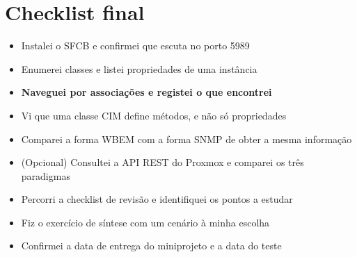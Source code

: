 \documentclass[11pt,a4paper]{article}
\begin{document}
\section{Checklist final}

\begin{itemize}
  \item[$\square$] Instalei o SFCB e confirmei que escuta no porto 5989
  \item[$\square$] Enumerei classes e listei propriedades de uma instância
  \item[$\square$] \textbf{Naveguei por associações e registei o que encontrei}
  \item[$\square$] Vi que uma classe CIM define métodos, e não só propriedades
  \item[$\square$] Comparei a forma WBEM com a forma SNMP de obter a mesma informação
  \item[$\square$] (Opcional) Consultei a API REST do Proxmox e comparei os três paradigmas
  \item[$\square$] Percorri a checklist de revisão e identifiquei os pontos a estudar
  \item[$\square$] Fiz o exercício de síntese com um cenário à minha escolha
  \item[$\square$] Confirmei a data de entrega do miniprojeto e a data do teste
\end{itemize}
\end{document}
